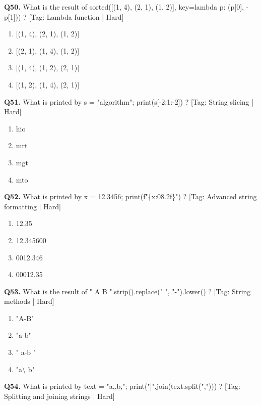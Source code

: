 \vspace{2mm}
\noindent\textbf{Q50.} What is the result of sorted([(1, 4), (2, 1), (1, 2)], key=lambda p: (p[0], -p[1])) ? \hfill [Tag: Lambda function | Hard]
\begin{enumerate}[label=(\alph*),topsep=2pt,itemsep=1pt,partopsep=0pt,parsep=0pt]
    \item {[(1, 4), (2, 1), (1, 2)]}
    \item {[(2, 1), (1, 4), (1, 2)]}
    \item {[(1, 4), (1, 2), (2, 1)]}
    \item {[(1, 2), (1, 4), (2, 1)]}
\end{enumerate}
\vspace{2mm}
\noindent\textbf{Q51.} What is printed by s = "algorithm"; print(s[-2:1:-2]) ? \hfill [Tag: String slicing | Hard]
\begin{enumerate}[label=(\alph*),topsep=2pt,itemsep=1pt,partopsep=0pt,parsep=0pt]
    \item {hio}
    \item {mrt}
    \item {mgt}
    \item {mto}
\end{enumerate}
\vspace{2mm}
\noindent\textbf{Q52.} What is printed by x = 12.3456; print(f"\{x:08.2f\}") ? \hfill [Tag: Advanced string formatting | Hard]
\begin{enumerate}[label=(\alph*),topsep=2pt,itemsep=1pt,partopsep=0pt,parsep=0pt]
    \item {12.35}
    \item {12.345600}
    \item {0012.346}
    \item {00012.35}
\end{enumerate}
\vspace{2mm}
\noindent\textbf{Q53.} What is the result of " A B ".strip().replace(" ", "-").lower() ? \hfill [Tag: String methods | Hard]
\begin{enumerate}[label=(\alph*),topsep=2pt,itemsep=1pt,partopsep=0pt,parsep=0pt]
    \item {"A-B"}
    \item {"a-b"}
    \item {" a-b "}
    \item {"a\textbackslash{} b"}
\end{enumerate}
\vspace{2mm}
\noindent\textbf{Q54.} What is printed by text = "a,,b,"; print("|".join(text.split(","))) ? \hfill [Tag: Splitting and joining strings | Hard]
